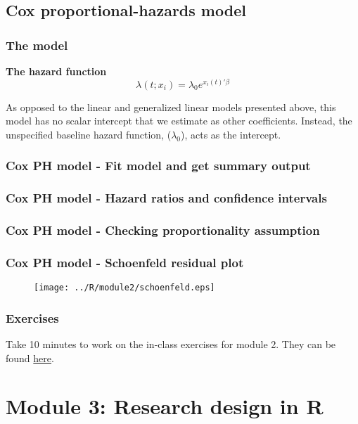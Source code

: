 \documentclass{beamer}
\begin{document}
\subsection{Cox proportional-hazards model}

\begin{frame}
    \frametitle{The model}
    \textbf{The hazard function}
    \[\lambda(t; x_i) = \lambda_0 e^{x_i(t)' \beta}\]

    \bigskip
    As opposed to the linear and generalized linear models presented above,
    this model has no scalar intercept that we estimate as other coefficients.
    Instead, the unspecified baseline hazard function,
    ($\lambda_0$), acts as the intercept.
\end{frame}


\begin{frame}[fragile]
    \frametitle{Cox PH model - Fit model and get summary output}
    \fontsize{8}{10}\selectfont
    
\end{frame}


\begin{frame}[fragile]
    \frametitle{Cox PH model - Hazard ratios and confidence intervals}
    \fontsize{9}{11}\selectfont
    
\end{frame}


\begin{frame}[fragile]
    \frametitle{Cox PH model - Checking proportionality assumption}
    \fontsize{9}{11}\selectfont
    
\end{frame}


\begin{frame}[fragile]
    \frametitle{Cox PH model - Schoenfeld residual plot}
    \begin{figure}[b]
      \centering
      \texttt{[image: ../R/module2/schoenfeld.eps]}
    \end{figure}
\end{frame}


\begin{frame}
    \frametitle{Exercises}
    Take 10 minutes to work on the in-class exercises for module 2.
    They can be found \href{https://github.com/rnitulescu/RcourseOncology2021/blob/master/exercises2.R}{here}.
\end{frame}



\section{Module 3: Research design in R}
\end{document}
